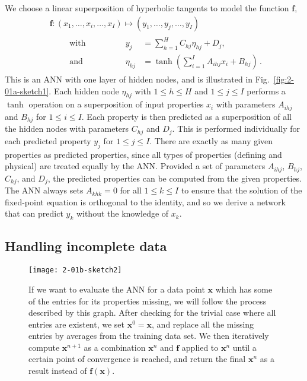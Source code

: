 \documentclass[review]{elsarticle}
\newcommand{\figref}[1]{Fig.~\ref{#1}}
\newcommand{\punc}[1]{\,#1}
\newcommand{\arr}[2]{\begin{array}{#1}#2\end{array}}   %
\newcommand{\vx}{\textbf{x}}
\newcommand{\vf}{\textbf{f}}
\begin{document}
We choose a linear
superposition of hyperbolic tangents to model the function $\vf$,
%
\begin{align}
&\vf:(x_1,\ldots,x_i,\ldots,x_I)\mapsto(y_1,\ldots,y_j,\ldots,y_I)\label{eq:2-01-mapping}\\
&\arr{lrl}
{
 \qquad\mathrm{with}\qquad\qquad&
 y_j&=\sum_{h=1}^{H}C_{hj}\eta_{hj}+D_j,\\
 \qquad\mathrm{and} \qquad\qquad&
 \eta_{hj}&=\tanh\left(\sum_{i=1}^{I}A_{ihj}x_i+B_{hj}\right)\punc{.}
}
\nonumber
\end{align}
%
This is an ANN with one layer of hidden nodes, and is illustrated in
\figref{fig:2-01a-sketch1}. Each hidden node $\eta_{hj}$ with
$1\leq h\leq H$ and $1\leq j\leq I$ performs a $\tanh$ operation on a
superposition of input properties $x_i$ with parameters $A_{ihj}$ and
$B_{hj}$ for $1\leq i\leq I$. Each property is then predicted as a
superposition of all the hidden nodes with parameters $C_{hj}$ and
$D_j$. This is performed individually for each predicted property $y_j$ for
$1\leq j\leq I$. There are exactly as many given properties as predicted
properties, since all types of properties (defining and physical) are
treated equally by the ANN. Provided a set of parameters $A_{ihj}$,
$B_{hj}$, $C_{hj}$, and $D_j$, the predicted properties can be computed from
the given properties. The ANN always sets $A_{khk}=0$ for all
$1\leq k\leq I$ to ensure that the solution of the fixed-point equation is
orthogonal to the identity, and so we derive a network that can predict
$y_k$ without the knowledge of $x_k$.

\subsection{Handling incomplete data} \label{sec:frameworkfrag}

\begin{figure}
 \centering
 \texttt{[image: 2-01b-sketch2]}
 \caption{If we want to evaluate the ANN for a data point $\vx$ which has
   some of the entries for its properties missing, we will follow the
   process described by this graph. After checking for the trivial case
   where all entries are existent, we set $\vx^0 = \vx$, and replace all the
   missing entries by averages from the training data set. We then
   iteratively compute $\vx^{n+1}$ as a combination $\vx^n$ and $\vf$
   applied to $\vx^n$ until a certain point of convergence is reached, and
   return the final $\vx^n$ as a result instead of $\vf(\vx)$.}
 \label{fig:2-01b-sketch2}
\end{figure}
\end{document}
